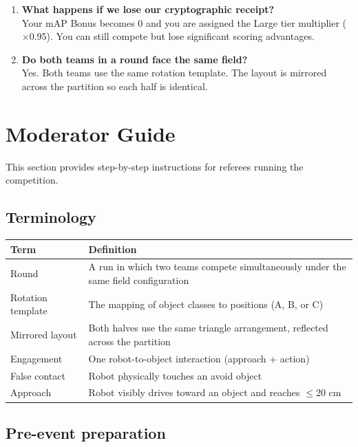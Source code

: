 \documentclass[a4]{article}
\begin{document}
\begin{enumerate}[label=\textbf{Q\arabic*:}, leftmargin=2.5em]
    \item \textbf{What happens if we lose our cryptographic receipt?} \\
    Your mAP Bonus becomes 0 and you are assigned the Large tier multiplier ($\times$0.95). You can still compete but lose significant scoring advantages.

    \item \textbf{Do both teams in a round face the same field?} \\
    Yes. Both teams use the same rotation template. The layout is mirrored across the partition so each half is identical.
\end{enumerate}

\pagebreak
\section{Moderator Guide}

This section provides step-by-step instructions for referees running the competition.

\subsection*{Terminology}

\begin{table}[H]
\centering
\begin{tabular}{lp{10cm}}
\toprule
\textbf{Term} & \textbf{Definition} \\
\midrule
Round & A run in which two teams compete simultaneously under the same field configuration \\
Rotation template & The mapping of object classes to positions (A, B, or C) \\
Mirrored layout & Both halves use the same triangle arrangement, reflected across the partition \\
Engagement & One robot-to-object interaction (approach + action) \\
False contact & Robot physically touches an avoid object \\
Approach & Robot visibly drives toward an object and reaches $\leq$20 cm \\
\bottomrule
\end{tabular}
\end{table}

\subsection*{Pre-event preparation}
\end{document}
